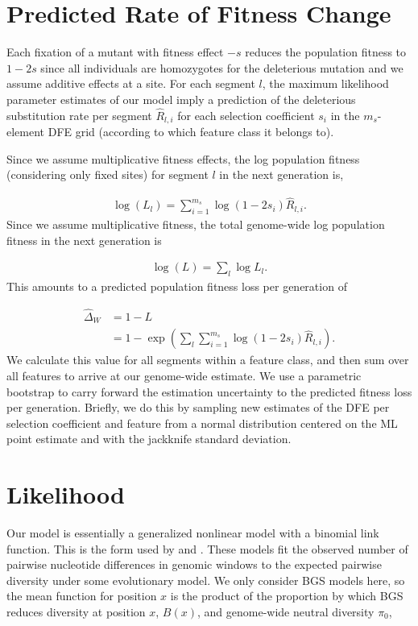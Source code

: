 \documentclass[11pt]{article}
\begin{document}
\section{Predicted Rate of Fitness Change}

Each fixation of a mutant with fitness effect $-s$ reduces the population
fitness to $1-2s$ since all individuals are homozygotes for the deleterious
mutation and we assume additive effects at a site. For each segment $l$, the
maximum likelihood parameter estimates of our model imply a prediction of the
deleterious substitution rate per segment $\widehat{R}_{l,i}$ for each
selection coefficient $s_i$ in the $m_s$-element DFE grid (according to which
feature class it belongs to).

Since we assume multiplicative fitness effects, the log population fitness
(considering only fixed sites) for segment $l$ in the next generation is,

\begin{align}
    \log(L_{l}) = \sum_{i=1}^{m_s} \log(1-2 s_i) \widehat{R}_{l,i}.
\end{align}
%
Since we assume multiplicative fitness, the total genome-wide log population
fitness in the next generation is

\begin{align}
    \log(L) = \sum_{l} \log{L_l}.
\end{align}
%
This amounts to a predicted population fitness loss per generation of

\begin{align}
    \widehat{\Delta}_W &= 1 - L \\  \nonumber
             &= 1 - \exp\left(\sum_{l} \sum_{i=1}^{m_s} \log(1-2s_i) \widehat{R}_{l,i} \right).
\end{align}
%
We calculate this value for all segments within a feature class, and then sum
over all features to arrive at our genome-wide estimate. We use a parametric
bootstrap to carry forward the estimation uncertainty to the predicted fitness
loss per generation. Briefly, we do this by sampling new estimates of the DFE
per selection coefficient and feature from a normal distribution centered on
the ML point estimate and with the jackknife standard deviation.

\section{Likelihood}

Our model is essentially a generalized nonlinear model with a binomial link
function. This is the form used by \textcite{Elyashiv2016-vt} and
\textcite{Murphy2022-sj}. These models fit the observed number of pairwise
nucleotide differences in genomic windows to the expected pairwise diversity
under some evolutionary model. We only consider BGS models here, so the mean
function for position $x$ is the product of the proportion by which BGS reduces
diversity at position $x$, $B(x)$, and genome-wide neutral diversity $\pi_0$,
\end{document}
